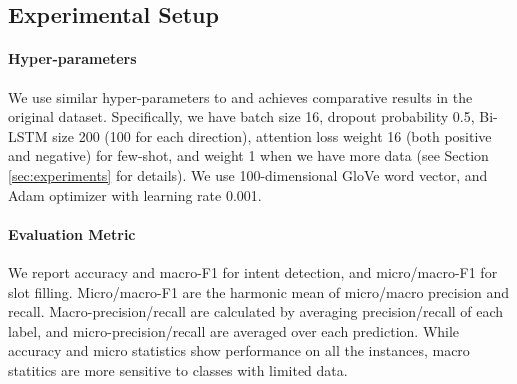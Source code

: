 

\subsection{Experimental Setup}
\paragraph{Hyper-parameters}
We use similar hyper-parameters to \cite{liu2016attention} and achieves comparative results in the original dataset. Specifically, we have batch size 16, dropout probability 0.5, Bi-LSTM size 200 (100 for each direction), attention loss weight 16 (both positive and negative) for few-shot, and weight 1 when we have more data (see Section \ref{sec:experiments} for details). We use 100-dimensional GloVe \cite{pennington2014glove} word vector, and Adam optimizer \cite{kingma2014adam} with learning rate 0.001.

\paragraph{Evaluation Metric}
We report accuracy and macro-F1 for intent detection, and micro/macro-F1 for slot filling.
Micro/macro-F1 are the harmonic mean of micro/macro precision and recall.
Macro-precision/recall are calculated by averaging precision/recall of each label, and micro-precision/recall are averaged over each prediction.
While accuracy and micro statistics show performance on all the instances, macro statitics are more sensitive to classes with limited data.

